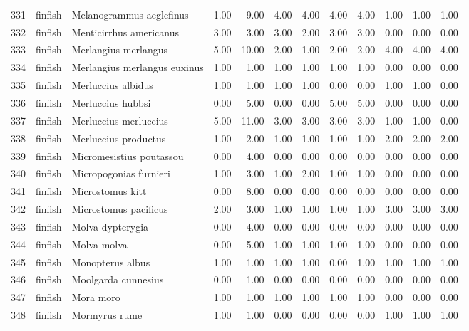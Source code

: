 \begin{table}[ht]
\begin{tabular}{rllrrrrrrrrr}
  331 & finfish & Melanogrammus aeglefinus & 1.00 & 9.00 & 4.00 & 4.00 & 4.00 & 4.00 & 1.00 & 1.00 & 1.00 \\ 
  332 & finfish & Menticirrhus americanus & 3.00 & 3.00 & 3.00 & 2.00 & 3.00 & 3.00 & 0.00 & 0.00 & 0.00 \\ 
  333 & finfish & Merlangius merlangus & 5.00 & 10.00 & 2.00 & 1.00 & 2.00 & 2.00 & 4.00 & 4.00 & 4.00 \\ 
  334 & finfish & Merlangius merlangus euxinus & 1.00 & 1.00 & 1.00 & 1.00 & 1.00 & 1.00 & 0.00 & 0.00 & 0.00 \\ 
  335 & finfish & Merluccius albidus & 1.00 & 1.00 & 1.00 & 1.00 & 0.00 & 0.00 & 1.00 & 1.00 & 0.00 \\ 
  336 & finfish & Merluccius hubbsi & 0.00 & 5.00 & 0.00 & 0.00 & 5.00 & 5.00 & 0.00 & 0.00 & 0.00 \\ 
  337 & finfish & Merluccius merluccius & 5.00 & 11.00 & 3.00 & 3.00 & 3.00 & 3.00 & 1.00 & 1.00 & 0.00 \\ 
  338 & finfish & Merluccius productus & 1.00 & 2.00 & 1.00 & 1.00 & 1.00 & 1.00 & 2.00 & 2.00 & 2.00 \\ 
  339 & finfish & Micromesistius poutassou & 0.00 & 4.00 & 0.00 & 0.00 & 0.00 & 0.00 & 0.00 & 0.00 & 0.00 \\ 
  340 & finfish & Micropogonias furnieri & 1.00 & 3.00 & 1.00 & 2.00 & 1.00 & 1.00 & 0.00 & 0.00 & 0.00 \\ 
  341 & finfish & Microstomus kitt & 0.00 & 8.00 & 0.00 & 0.00 & 0.00 & 0.00 & 0.00 & 0.00 & 0.00 \\ 
  342 & finfish & Microstomus pacificus & 2.00 & 3.00 & 1.00 & 1.00 & 1.00 & 1.00 & 3.00 & 3.00 & 3.00 \\ 
  343 & finfish & Molva dypterygia & 0.00 & 4.00 & 0.00 & 0.00 & 0.00 & 0.00 & 0.00 & 0.00 & 0.00 \\ 
  344 & finfish & Molva molva & 0.00 & 5.00 & 1.00 & 1.00 & 1.00 & 1.00 & 0.00 & 0.00 & 0.00 \\ 
  345 & finfish & Monopterus albus & 1.00 & 1.00 & 1.00 & 1.00 & 0.00 & 1.00 & 1.00 & 1.00 & 1.00 \\ 
  346 & finfish & Moolgarda cunnesius & 0.00 & 1.00 & 0.00 & 0.00 & 0.00 & 0.00 & 0.00 & 0.00 & 0.00 \\ 
  347 & finfish & Mora moro & 1.00 & 1.00 & 1.00 & 1.00 & 1.00 & 1.00 & 0.00 & 0.00 & 0.00 \\ 
  348 & finfish & Mormyrus rume & 1.00 & 1.00 & 0.00 & 0.00 & 0.00 & 0.00 & 1.00 & 1.00 & 1.00 \\ 

\end{tabular}
\end{table}
